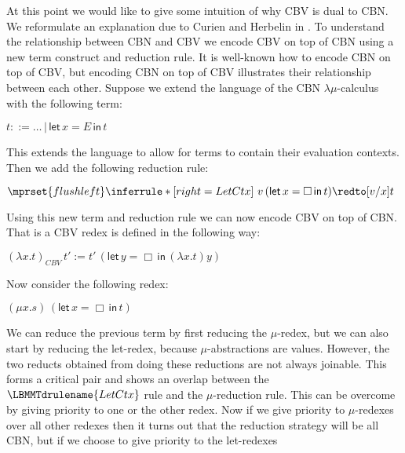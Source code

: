 At this point we would like to give some intuition of why CBV is dual
to CBN.  We reformulate an explanation due to Curien and Herbelin in
\cite{Curien:2000}.  To understand the relationship between CBN and
CBV we encode CBV on top of CBN using a new term construct and
reduction rule.  It is well-known how to encode CBN on top of CBV, but
encoding CBN on top of CBV illustrates their relationship between each
other.  Suppose we extend the language of the CBN
$\lambda\mu$-calculus with the following term:
\begin{center}
  \begin{math}
    t ::= \ldots\,|\,\textsf{let}\,x = E\,\textsf{in}\,t
  \end{math}
\end{center}
This extends the language to allow for terms to contain their evaluation
contexts.  Then we add the following reduction rule:
\begin{center}
  \begin{math}
    $$\mprset{flushleft}
    \inferrule* [right=LetCtx] {
      \ 
    }{v\,(\textsf{let}\,x = \Box\,\textsf{in}\,t) \redto [v/x]t}
  \end{math}
\end{center}
Using this new term and reduction rule we can now encode CBV on top
of CBN.  That is a CBV redex is defined in the following way:
\begin{center}
  \begin{math}
    (\lambda x.t)_{CBV}\,t' := t'\,(\textsf{let}\,y = \Box\,\textsf{in}\,(\lambda x.t) y)
  \end{math}
\end{center}
Now consider the following redex:
\begin{center}
  \begin{math}
    (\mu x.s)\,(\textsf{let}\,x = \Box\,\textsf{in}\,t)
  \end{math}
\end{center}
We can reduce the previous term by first reducing the $\mu$-redex, but
we can also start by reducing the let-redex, because
$\mu$-abstractions are values. However, the two reducts obtained from
doing these reductions are not always joinable.  This forms a critical
pair and shows an overlap between the $\LBMMTdrulename{LetCtx}$ rule
and the $\mu$-reduction rule.  This can be overcome by giving priority
to one or the other redex.  Now if we give priority to $\mu$-redexes
over all other redexes then it turns out that the reduction strategy
will be all CBN, but if we choose to give priority to the let-redexes
